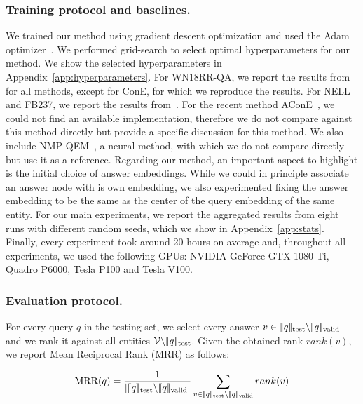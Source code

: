 \documentclass[runningheads]{llncs}
\renewcommand{\paragraph}[1]{\subsubsection{#1}}
\begin{document}
\paragraph{Training protocol and baselines.} We trained our method
using gradient descent optimization and used the Adam
optimizer~\cite{adam}. We performed grid-search to select optimal
hyperparameters for our method. We show the selected hyperparameters
in Appendix~\ref{app:hyperparameters}.  For WN18RR-QA, we report the
results from~\cite{line} for all methods, except for ConE, for which
we reproduce the results. For NELL and FB237, we report the results
from~\cite{cone}. For the recent method AConE~\cite{acone}, we could
not find an available implementation, therefore we do not compare
against this method directly but provide a specific discussion for
this method. We also include NMP-QEM~\cite{long-etal-2022-neural}, a
neural method, with which we do not compare directly but use it as a
reference. Regarding our method, an important aspect to highlight is
the initial choice of answer embeddings. While we could in principle
associate an answer node with is own embedding, we also experimented
fixing the answer embedding to be the same as the center of the query
embedding of the same entity. For our main experiments, we report the
aggregated results from eight runs with different random seeds, which
we show in Appendix~\ref{app:stats}. Finally, every experiment took
around 20 hours on average and, throughout all experiments, we used
the following GPUs: NVIDIA GeForce GTX 1080 Ti, Quadro P6000, Tesla
P100 and Tesla V100.

\paragraph{Evaluation protocol.} For every query $q$ in the testing
set, we select every answer
$v \in \llbracket q \rrbracket_{\mbox{\scriptsize test}} \backslash
\llbracket q \rrbracket_{\mbox{\scriptsize valid}}$ and we rank it
against all entities
$\mathcal{V} \backslash \llbracket q \rrbracket_{\mbox{\scriptsize
    test}}$. Given the obtained rank $rank(v)$, we report Mean
Reciprocal Rank (MRR) as follows:

\begin{equation}
  \label{eq:mrr}
  \mbox{MRR}(q) = \frac{1}{|\llbracket q \rrbracket_{\mbox{\scriptsize test}} \backslash \llbracket q
    \rrbracket_{\mbox{\scriptsize valid}}|} \sum_{v \in \llbracket q \rrbracket_{\mbox{\tiny test}} \backslash \llbracket q
    \rrbracket_{\mbox{\tiny valid}}}{rank(v)}
\end{equation}
\end{document}
